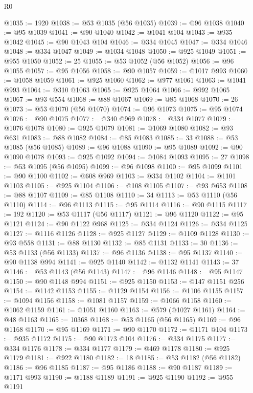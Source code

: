 \begin{lexlean}{R0}
\begin{coremodule}
@1035 := 1920
@1038 := @53 @1035 (@56 @1035)
@1039 := @96 @1038
@1040 := @95 @1039
@1041 := @90 @1040
@1042 := @1041 @104
@1043 := @935 @1042
@1045 := @90 @1043 @104
@1046 := @334 @1045
@1047 := @334 @1046
@1048 := @334 @1047
@1049 := @1034 @1048
@1050 := @925 @1049
@1051 := @955 @1050
@1052 := 25
@1055 := @53 @1052 (@56 @1052)
@1056 := @96 @1055
@1057 := @95 @1056
@1058 := @90 @1057
@1059 := @1017 @993
@1060 := @1058 @1059
@1061 := @925 @1060
@1062 := @977 @1061
@1063 := @1041 @993
@1064 := @310 @1063
@1065 := @925 @1064
@1066 := @992 @1065
@1067 := @93 @554
@1068 := @88 @1067
@1069 := @85 @1068
@1070 := 26
@1073 := @53 @1070 (@56 @1070)
@1074 := @96 @1073
@1075 := @95 @1074
@1076 := @90 @1075
@1077 := @340 @969
@1078 := @334 @1077
@1079 := @1076 @1078
@1080 := @925 @1079
@1081 := @1069 @1080
@1082 := @93 @631
@1083 := @88 @1082
@1084 := @85 @1083
@1085 := 33
@1088 := @53 @1085 (@56 @1085)
@1089 := @96 @1088
@1090 := @95 @1089
@1092 := @90 @1090 @1078
@1093 := @925 @1092
@1094 := @1084 @1093
@1095 := 27
@1098 := @53 @1095 (@56 @1095)
@1099 := @96 @1098
@1100 := @95 @1099
@1101 := @90 @1100
@1102 := @608 @969
@1103 := @334 @1102
@1104 := @1101 @1103
@1105 := @925 @1104
@1106 := @108 @1105
@1107 := @93 @653
@1108 := @88 @1107
@1109 := @85 @1108
@1110 := 34
@1113 := @53 @1110 (@56 @1110)
@1114 := @96 @1113
@1115 := @95 @1114
@1116 := @90 @1115
@1117 := 192
@1120 := @53 @1117 (@56 @1117)
@1121 := @96 @1120
@1122 := @95 @1121
@1124 := @90 @1122 @968
@1125 := @334 @1124
@1126 := @334 @1125
@1127 := @1116 @1126
@1128 := @925 @1127
@1129 := @1109 @1128
@1130 := @93 @558
@1131 := @88 @1130
@1132 := @85 @1131
@1133 := 30
@1136 := @53 @1133 (@56 @1133)
@1137 := @96 @1136
@1138 := @95 @1137
@1140 := @90 @1138 @994
@1141 := @925 @1140
@1142 := @1132 @1141
@1143 := 37
@1146 := @53 @1143 (@56 @1143)
@1147 := @96 @1146
@1148 := @95 @1147
@1150 := @90 @1148 @994
@1151 := @925 @1150
@1153 := @147 @1151 @256
@1154 := @1142 @1153
@1155 := @1129 @1154
@1156 := @1106 @1155
@1157 := @1094 @1156
@1158 := @1081 @1157
@1159 := @1066 @1158
@1160 := @1062 @1159
@1161 := @1051 @1160
@1163 := @579 (@1027 @1161)
@1164 := @48 @1163
@1165 := 10368
@1168 := @53 @1165 (@56 @1165)
@1169 := @96 @1168
@1170 := @95 @1169
@1171 := @90 @1170
@1172 := @1171 @104
@1173 := @935 @1172
@1175 := @90 @1173 @104
@1176 := @334 @1175
@1177 := @334 @1176
@1178 := @334 @1177
@1179 := @469 @1178
@1180 := @925 @1179
@1181 := @922 @1180
@1182 := 18
@1185 := @53 @1182 (@56 @1182)
@1186 := @96 @1185
@1187 := @95 @1186
@1188 := @90 @1187
@1189 := @1171 @993
@1190 := @1188 @1189
@1191 := @925 @1190
@1192 := @955 @1191

\end{coremodule}
\end{lexlean}
